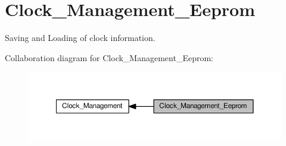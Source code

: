 \hypertarget{group___clock___management___eeprom}{}\section{Clock\+\_\+\+Management\+\_\+\+Eeprom}
\label{group___clock___management___eeprom}


Saving and Loading of clock information.  


Collaboration diagram for Clock\+\_\+\+Management\+\_\+\+Eeprom\+:\nopagebreak
\begin{figure}[H]
\begin{center}
\leavevmode
\includegraphics[width=350pt]{df/d13/group___clock___management___eeprom}
\end{center}
\end{figure}
